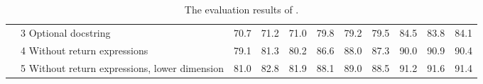\begin{table*}
\begin{tabular}{llrrrrrrrrr}
                                & 3 \tiny{Optional docstring}                          & 70.7                            & 71.2                           & 71.0                    & 79.8                            & 79.2                           & 79.5                    & 84.5                            & 83.8                           & 84.1                         \\
                                & 4 \tiny{Without return expressions}                  & 79.1                            & 81.3                           & 80.2                    & 86.6                            & 88.0                           & 87.3                    & 90.0                            & 90.9                           & 90.4                         \\
                                & 5 \tiny{Without return expressions, lower dimension} & 81.0                            & 82.8                           & 81.9                    & 88.1                            & 89.0                           & 88.5                    & 91.2                            & 91.6                           & 91.4                         \\ 
\bottomrule
\end{tabular}
\caption{The evaluation results of \dltpy.}
\label{table:results}
\end{table*}
